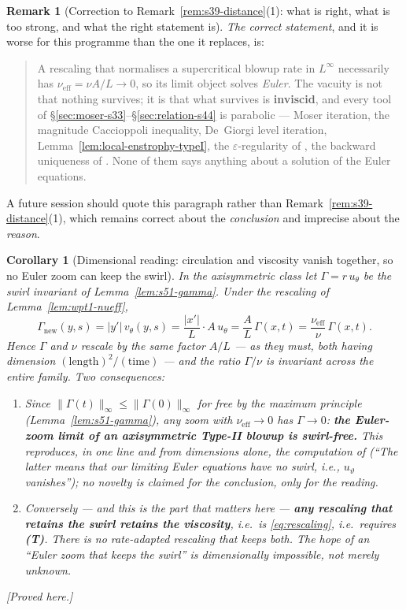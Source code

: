 \documentclass[11pt]{article}
\newtheorem{corollary}[theorem]{Corollary}
\theoremstyle{definition}
\newtheorem{remark}[theorem]{Remark}
\theoremstyle{remark}
\begin{document}
\begin{remark}[Correction to Remark~\ref{rem:s39-distance}(1): what is right,
  what is too strong, and what the right statement is]
  \emph{The correct statement}, and it is worse for this programme than the
  one it replaces, is:
  \begin{quote}
    A rescaling that normalises a supercritical blowup rate in $L^\infty$
    necessarily has $\nu_{\mathrm{eff}}=\nu A/L\to0$, so its limit object
    solves \emph{Euler}. The vacuity is not that nothing survives; it is that
    what survives is \textbf{inviscid}, and every tool of
    \S\ref{sec:moser-s33}--\S\ref{sec:relation-s44} is parabolic --- Moser
    iteration, the magnitude Caccioppoli inequality, De~Giorgi level
    iteration, Lemma~\ref{lem:local-enstrophy-typeI}, the
    $\varepsilon$-regularity of \cite{CKN1982}, the backward uniqueness of
    \cite{EscauriazaSereginSverak2003}. None of them says anything about a
    solution of the Euler equations.
  \end{quote}
  A future session should quote this paragraph rather than
  Remark~\ref{rem:s39-distance}(1), which remains correct about the
  \emph{conclusion} and imprecise about the \emph{reason}.
\end{remark}

\begin{corollary}[Dimensional reading: circulation and viscosity vanish
  together, so no Euler zoom can keep the swirl]\label{cor:wpt1-swirl}
  In the axisymmetric class let $\Gamma=r\,u_\theta$ be the swirl invariant of
  Lemma~\ref{lem:s51-gamma}. Under the rescaling of
  Lemma~\ref{lem:wpt1-nueff},
  \[
    \Gamma_{\mathrm{new}}(y,s)=|y'|\,v_\theta(y,s)
      =\frac{|x'|}{L}\cdot A\,u_\theta
      =\frac{A}{L}\,\Gamma(x,t)
      =\frac{\nu_{\mathrm{eff}}}{\nu}\,\Gamma(x,t).
  \]
  Hence $\Gamma$ and $\nu$ rescale by \emph{the same} factor $A/L$ --- as they
  must, both having dimension $(\text{length})^2/(\text{time})$ --- and the
  ratio $\Gamma/\nu$ is invariant across the entire family. Two consequences:
  \begin{enumerate}[label=\textup{(\roman*)},leftmargin=2.6em]
    \item Since $\|\Gamma(t)\|_\infty\leq\|\Gamma(0)\|_\infty$ for free by the
      maximum principle (Lemma~\ref{lem:s51-gamma}), any zoom with
      $\nu_{\mathrm{eff}}\to0$ has $\Gamma\to0$: \textbf{the Euler-zoom limit
      of an axisymmetric Type-II blowup is swirl-free.} This reproduces, in
      one line and from dimensions alone, the computation of
      \cite{Seregin2026Axisym} (``The latter means that our limiting Euler
      equations have no swirl, i.e., $u_\vartheta$ vanishes''); no novelty is
      claimed for the conclusion, only for the reading.
    \item Conversely --- and this is the part that matters here ---
      \textbf{any rescaling that retains the swirl retains the viscosity},
      i.e.\ is \eqref{eq:rescaling}, i.e.\ requires \textbf{(T)}. There is no
      rate-adapted rescaling that keeps both. The hope of an ``Euler zoom
      that keeps the swirl'' is dimensionally impossible, not merely unknown.
  \end{enumerate}
  \emph{[Proved here.]}
\end{corollary}
\end{document}
